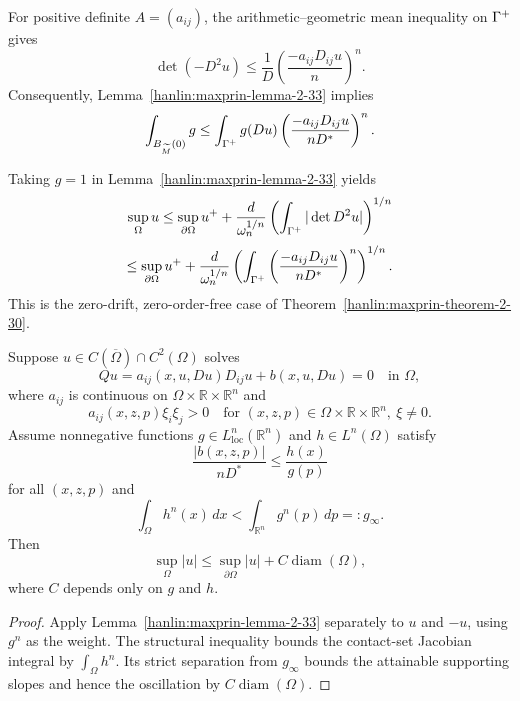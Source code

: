 \begin{remark}\label{hanlin:maxprin-remark-2-34}


For positive definite $A=(a_{ij})$, the arithmetic--geometric mean inequality
on $\Gamma^+$ gives
\[
\det(-D^2u)\le\frac1D
\left(\frac{-a_{ij}D_{ij}u}{n}\right)^n.
\]
Consequently, Lemma~\ref{hanlin:maxprin-lemma-2-33} implies
\[
\int_{B_{\widetilde{M}}(0)}g
\le\int_{\Gamma^+}g(Du)
\left(\frac{-a_{ij}D_{ij}u}{nD^*}\right)^n.
\]
\end{remark}

\begin{remark}\label{hanlin:maxprin-remark-2-35}


Taking $g=1$ in Lemma~\ref{hanlin:maxprin-lemma-2-33} yields
\[
\sup_\Omega u\le\sup_{\partial\Omega}u^+
+\frac d{\omega_n^{1/n}}
\left(\int_{\Gamma^+}|\det D^2u|\right)^{1/n}
\]
\[
\le\sup_{\partial\Omega}u^+
+\frac d{\omega_n^{1/n}}
\left(\int_{\Gamma^+}
\left(\frac{-a_{ij}D_{ij}u}{nD^*}\right)^n\right)^{1/n}.
\]
This is the zero-drift, zero-order-free case of
Theorem~\ref{hanlin:maxprin-theorem-2-30}.
\end{remark}

\begin{theorem}\label{hanlin:maxprin-theorem-2-36}
Suppose $u\in C(\overline\Omega)\cap C^2(\Omega)$ solves
\[
Qu=a_{ij}(x,u,Du)D_{ij}u+b(x,u,Du)=0
\quad\text{in }\Omega,
\]
where $a_{ij}$ is continuous on
$\Omega\times\mathbb R\times\mathbb R^n$ and
\[
a_{ij}(x,z,p)\xi_i\xi_j>0
\quad\text{for }(x,z,p)\in\Omega\times\mathbb R\times\mathbb R^n,
\ \xi\ne0.
\]
Assume nonnegative functions $g\in L^n_{\mathrm{loc}}(\mathbb R^n)$ and
$h\in L^n(\Omega)$ satisfy
\[
\frac{|b(x,z,p)|}{nD^*}\le\frac{h(x)}{g(p)}
\]
for all $(x,z,p)$ and
\[
\int_\Omega h^n(x)\,dx
<\int_{\mathbb R^n}g^n(p)\,dp=:g_\infty.
\]
Then
\[
\sup_\Omega|u|\le\sup_{\partial\Omega}|u|+C\operatorname{diam}(\Omega),
\]
where $C$ depends only on $g$ and $h$.
\end{theorem}
\begin{proof}
\sketch Apply Lemma~\ref{hanlin:maxprin-lemma-2-33} separately to $u$ and
$-u$, using $g^n$ as the weight. The structural inequality bounds the
contact-set Jacobian integral by $\int_\Omega h^n$. Its strict separation from
$g_\infty$ bounds the attainable supporting slopes and hence the oscillation by
$C\operatorname{diam}(\Omega)$.
\end{proof}

